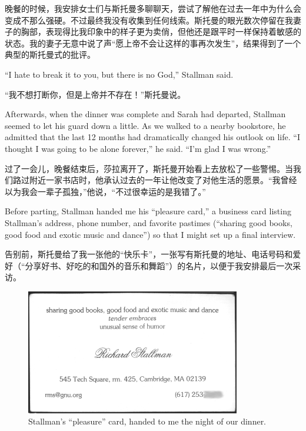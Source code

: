\ifdefined\chs
晚餐的时候，我安排女士们与斯托曼多聊聊天，尝试了解他在过去一年中为什么会变成不那么强硬。不过最终我没有收集到任何线索。斯托曼的眼光数次停留在我妻子的胸部，表现得比我印象中的样子更为卖俏，但他还是跟平时一样保持着敏感的状态。我的妻子无意中说了声``愿上帝不会让这样的事再次发生''，结果得到了一个典型的斯托曼式的批评。
\fi

\ifdefined\eng
``I hate to break it to you, but there is no God,'' Stallman said. %
\fi

\ifdefined\chs
``我不想打断你，但是上帝并不存在！''斯托曼说。%
\fi

\ifdefined\eng
Afterwards, when the dinner was complete and Sarah had departed, Stallman seemed to let his guard down a little. As we walked to a nearby bookstore, he admitted that the last 12 months had dramatically changed his outlook on life. ``I thought I was going to be alone forever,'' he said. ``I'm glad I was wrong.''
\fi

\ifdefined\chs
过了一会儿，晚餐结束后，莎拉离开了，斯托曼开始看上去放松了一些警惕。当我们路过附近一家书店时，他承认过去的一年让他改变了对他生活的愿景。``我曾经以为我会一辈子孤独，''他说，``不过很幸运的是我错了。''
\fi

\ifdefined\eng
Before parting, Stallman handed me his ``pleasure card,'' a business card listing Stallman's address, phone number, and favorite pastimes (``sharing good books, good food and exotic music and dance'') so that I might set up a final interview.
\fi

\ifdefined\chs
告别前，斯托曼给了我一张他的``快乐卡''，一张写有斯托曼的地址、电话号码和爱好（``分享好书、好吃的和国外的音乐和舞蹈''）的名片，以便于我安排最后一次采访。
\fi

\ifdefined\eng
\begin{figure}[ht] \centering
  \includegraphics{pleasurecard}
  \caption{Stallman's ``pleasure'' card, handed to me the night of our dinner.}
\end{figure}
\fi

